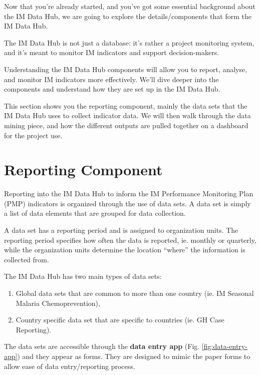 \documentclass[]{book}
\providecommand{\tightlist}{%
  \setlength{\itemsep}{0pt}\setlength{\parskip}{0pt}}
\begin{document}
Now that you're already started, and you've got some essential background about the IM Data Hub, we are going to explore the details/components that form the IM Data Hub.

The IM Data Hub is not just a database: it's rather a project monitoring system, and it's meant to monitor IM indicators and support decision-makers.

Understanding the IM Data Hub components will allow you to report, analyse, and monitor IM indicators more effectively. We'll dive deeper into the components and understand how they are set up in the IM Data Hub.

This section shows you the reporting component, mainly the data sets that the IM Data Hub uses to collect indicator data. We will then walk through the data mining piece, and how the different outputs are pulled together on a dashboard for the project use.

\hypertarget{reporting-component}{%
\section{Reporting Component}\label{reporting-component}}

Reporting into the IM Data Hub to inform the IM Performance Monitoring Plan (PMP) indicators is organized through the use of data sets. A data set is simply a list of data elements that are grouped for data collection.

A data set has a reporting period and is assigned to organization units. The reporting period specifies how often the data is reported, ie. monthly or quarterly, while the organization units determine the location ``where'' the information is collected from.

The IM Data Hub has two main types of data sets:

\begin{enumerate}
\def\labelenumi{\arabic{enumi}.}
\tightlist
\item
  Global data sets that are common to more than one country (ie. IM Seasonal Malaria Chemoprevention),
\item
  Country specific data set that are specific to countries (ie. GH Case Reporting).
\end{enumerate}

The data sets are accessible through the \textbf{data entry app} (Fig. \ref{fig:data-entry-app}) and they appear as forms. They are designed to mimic the paper forms to allow ease of data entry/reporting process.
\end{document}
